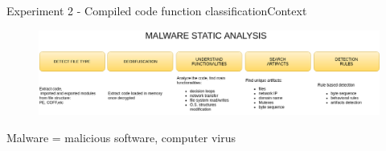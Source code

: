 \documentclass[xcolor=table]{beamer}
\begin{document}





\begin{frame}{Experiment 2 - Compiled code function classification}{Context}



\begin{figure}
    \includegraphics[scale=0.32]{./img/malware_static_analysis.png}
\end{figure}


Malware = malicious software, computer virus






\end{frame}
\end{document}
